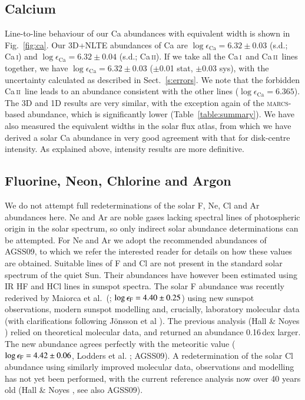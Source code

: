 \documentclass[traditabstract]{aa}
\newcommand{\marcs}{\textsc{marcs}}
\newcommand{\altcai}{Ca\,\textsc{i}}
\newcommand{\altcaii}{Ca\,\textsc{ii}}
\newcommand{\cai}{\altcai\ }
\newcommand{\caii}{\altcaii\ }
\begin{document}
\subsection{Calcium}
Line-to-line behaviour of our Ca abundances with equivalent width is shown in Fig.\ \ref{fig:ca}.  Our 3D+NLTE abundances of Ca are $\log\epsilon_{\mathrm{Ca}} = 6.32 \pm 0.03$ (s.d.; \altcai) and $\log\epsilon_{\mathrm{Ca}} = 6.32 \pm 0.04$ (s.d.; \altcaii). If we take all the \cai and \caii lines together, we have $\log\epsilon_{\mathrm{Ca}} = 6.32 \pm 0.03$ ($\pm$0.01 stat, $\pm$0.03 sys), with the uncertainty calculated as described in Sect.~\ref{s:errors}.  We note that the forbidden \caii line leads to an abundance consistent with the other lines ($\log\epsilon_{\mathrm{Ca}} = 6.365$).  The 3D and 1D results are very similar, with the exception again of the \marcs-based abundance, which is significantly lower (Table~\ref{table:summary}).  We have also measured the equivalent widths in the solar flux atlas, from which we have derived a solar Ca abundance in very good agreement with that for disk-centre intensity.  As explained above, intensity results are more definitive.


\subsection{Fluorine, Neon, Chlorine and Argon}
We do not attempt full redeterminations of the solar F, Ne, Cl and Ar abundances here. Ne and Ar are noble gases lacking spectral lines of photospheric origin in the solar spectrum, so only indirect solar abundance determinations can be attempted. For Ne and Ar we adopt the recommended abundances of AGSS09, to which we refer the interested reader for details on how these values are obtained.  Suitable lines of F and Cl are not present in the standard solar spectrum of the quiet Sun. Their abundances have however been estimated using IR HF and HCl lines in sunspot spectra.  The solar F abundance was recently rederived by Maiorca et al.\ (\cite{maiorca}; $\log\epsilon_{\rm F}=4.40\pm0.25$) using new sunspot observations, modern sunspot modelling and, crucially, laboratory molecular data (with clarifications following J\"onsson et al \cite{Jonsson14}).
The previous analysis (Hall \& Noyes \cite{hall_f}) relied on theoretical molecular data, and returned an abundance 0.16\,dex larger.  The new abundance agrees perfectly with the meteoritic value ($\log\epsilon_{\rm F}=4.42\pm0.06$, Lodders et al. \cite{lodd}; AGSS09).  A redetermination of the solar Cl abundance using similarly improved molecular data, observations and modelling has not yet been performed, with the current reference analysis now over 40 years old (Hall \& Noyes \cite{hall_cl}, see also AGSS09).
\end{document}
